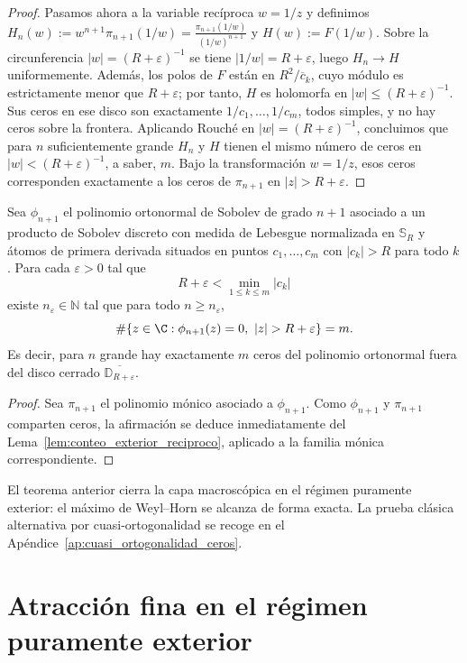 \begin{proof}
	Pasamos ahora a la variable recíproca $w=1/z$ y definimos $H_n(w):=w^{n+1}\pi_{n+1}(1/w)=\frac{\pi_{n+1}(1/w)}{(1/w)^{n+1}}$ y $H(w):=F(1/w)$.
	Sobre la circunferencia $|w|=(R+\varepsilon)^{-1}$ se tiene $|1/w|=R+\varepsilon$, luego $H_n\to H$ uniformemente. Además, los polos de $F$ están en $R^2/\overline c_k$, cuyo módulo es estrictamente menor que $R+\varepsilon$; por tanto, $H$ es holomorfa en $|w|\le (R+\varepsilon)^{-1}$. Sus ceros en ese disco son exactamente $1/c_1,\dots,1/c_m$, todos simples, y no hay ceros sobre la frontera. Aplicando Rouché en $|w|=(R+\varepsilon)^{-1}$, concluimos que para $n$ suficientemente grande $H_n$ y $H$ tienen el mismo número de ceros en $|w|<(R+\varepsilon)^{-1}$, a saber, $m$. Bajo la transformación $w=1/z$, esos ceros corresponden exactamente a los ceros de $\pi_{n+1}$ en $|z|>R+\varepsilon$.
\end{proof}

\begin{thm}\label{thm:conteo_ceros}
	Sea $\phi_{n+1}$ el polinomio ortonormal de Sobolev de grado $n+1$
	asociado a un producto de Sobolev discreto con medida de Lebesgue normalizada en $\mathbb S_R$ y
	átomos de primera derivada situados en puntos $c_1,\dots,c_m$ con $|c_k|>R$ para todo $k$. Para cada $\varepsilon>0$ tal que
	\[
		R+\varepsilon<\min_{1\le k\le m}|c_k|
	\]
	existe $n_\varepsilon\in\mathbb N$
	tal que para todo $n\ge n_\varepsilon$,
	\[
		\#\{z\in\C:\phi_{n+1}(z)=0,\ |z|>R+\varepsilon\}= m.
	\]
	Es decir, para $n$ grande hay exactamente $m$ ceros del polinomio ortonormal fuera del
	disco cerrado $\overline{\mathbb D_{R+\varepsilon}}$.
\end{thm}

\begin{proof}
	Sea $\pi_{n+1}$ el polinomio mónico asociado a $\phi_{n+1}$. Como $\phi_{n+1}$ y $\pi_{n+1}$ comparten ceros, la afirmación se deduce inmediatamente del Lema~\ref{lem:conteo_exterior_reciproco}, aplicado a la familia mónica correspondiente.
\end{proof}

El teorema anterior cierra la capa macroscópica en el régimen puramente exterior: el máximo de Weyl--Horn se alcanza de forma exacta. La prueba clásica alternativa por cuasi-ortogonalidad se recoge en el Apéndice~\ref{ap:cuasi_ortogonalidad_ceros}.

\section{Atracción fina en el régimen puramente exterior}

